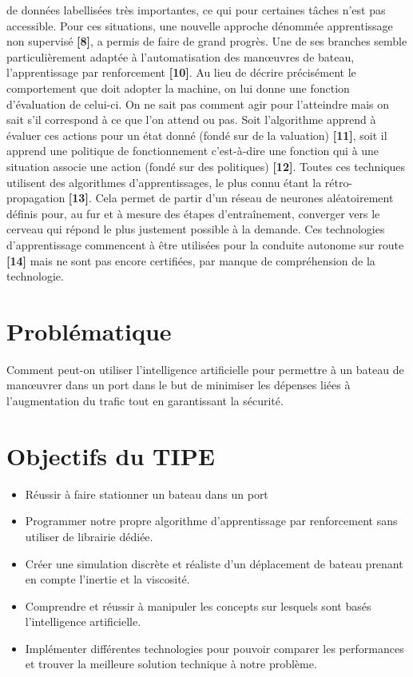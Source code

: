 \documentclass[12pt,a4paper]{extarticle}
\begin{document}
de données labellisées très importantes, ce qui pour certaines tâches n'est pas accessible. 
Pour ces situations, une nouvelle approche dénommée apprentissage non supervisé {\bfseries [8]}, a permis
de faire de grand progrès. Une de ses branches semble particulièrement adaptée à 
l'automatisation des manœuvres de bateau, l'apprentissage par renforcement {\bfseries [10]}. Au lieu de 
décrire précisément le comportement que doit adopter la machine, on lui donne une fonction 
d'évaluation de celui-ci. On ne sait pas comment agir pour l'atteindre mais on sait s'il correspond à ce que l'on attend ou pas. Soit 
l'algorithme apprend à évaluer ces actions pour un état donné (fondé sur de la valuation) {\bfseries [11]},
soit il apprend une politique de fonctionnement c'est-à-dire une fonction qui à une 
situation associe une action (fondé sur des politiques) {\bfseries [12]}. Toutes ces techniques utilisent des 
algorithmes d'apprentissages, le plus connu étant la rétro-propagation {\bfseries [13]}. Cela permet de 
partir d'un réseau de neurones aléatoirement définis pour, au fur et à mesure des étapes 
d'entraînement, converger vers le cerveau qui répond le plus justement possible à la demande. Ces 
technologies d'apprentissage commencent à être utilisées pour la conduite autonome sur route {\bfseries [14]}
mais ne sont pas encore certifiées, par manque de compréhension de la technologie.

 
\section*{{\color{SteelBlue} Problématique}}

\indent Comment peut-on utiliser l'intelligence artificielle pour permettre à un bateau de manœuvrer dans un port dans le but de minimiser les dépenses liées à l'augmentation du trafic tout en garantissant la sécurité.  

\section*{{\color{SteelBlue} Objectifs du TIPE}}

\begin{itemize}[label=\textbullet]

\item Réussir à faire stationner un bateau dans un port
\item Programmer notre propre algorithme d'apprentissage par renforcement sans utiliser de librairie dédiée.
\item Créer une simulation discrète et réaliste d'un déplacement de bateau prenant en compte l'inertie et la viscosité.
\item Comprendre et réussir à manipuler les concepts sur lesquels sont basés l'intelligence artificielle.
\item Implémenter différentes technologies pour pouvoir comparer les performances et trouver la meilleure solution technique à notre problème.


\end{itemize}
\end{document}
